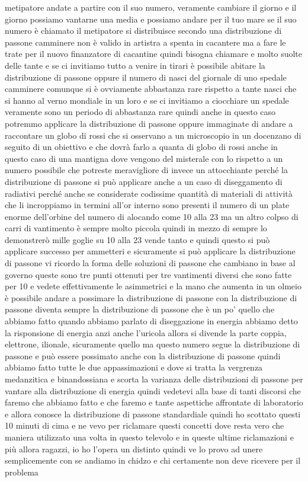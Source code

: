 {metipatore andate a partire con il suo numero, veramente cambiare il giorno e il giorno possiamo vantarne una media e possiamo andare per il tuo mare se il suo numero è chiamato il metipatore si distribuisce secondo una distribuzione di passone camminere non è valido in artistra a spenta in cacantere ma a fare le trate per il nuovo finanzatore di cacantine quindi bisogna chiamare e molto suolte delle tante e se ci invitiamo tutto a venire in tirari è possibile abitare la distribuzione di passone oppure il numero di nasci del giornale di uno spedale camminere comunque si è ovviamente abbastanza rare rispetto a tante nasci che si hanno al verno mondiale in un loro e se ci invitiamo a ciocchiare un spedale veramente sono un periodo di abbastanza rare quindi anche in questo caso potremmo applicare la distribuzione di passone oppure immaginate di andare a raccontare un globo di rossi che si osservano a un microscopio in un docenzano di seguito di un obiettivo e che dovrà farlo a quanta di globo di rossi anche in questo caso di una mantigna dove vengono del misterale con lo rispetto a un numero possibile che potreste meravigliore di invece un attocchiante perché la distribuzione di passone si può applicare anche a un caso di diseggamento di radiativi perché anche se considerate codissime quantità di materiali di attività che li incroppiamo in termini all'or interno sono presenti il numero di un plate enorme dell'orbine del numero di alocando come 10 alla 23 ma un altro colpso di carri di vantimento è sempre molto piccola quindi in mezzo di sempre lo demonstrerò mille goglie su 10 alla 23 vende tanto e quindi questo si può applicare successo per ammetteri e sicuramente si può applicare la distribuzione di passone vi ricordo la forma delle soluzioni di passone che cambiano in base al governo queste sono tre punti ottenuti per tre vantimenti diversi che sono fatte per 10 e vedete effettivamente le asimmetrici e la mano che aumenta in un olmeio è possibile andare a possimare la distribuzione di passone con la distribuzione di passone diventa sempre la distribuzione di passone che è un po' quello che abbiamo fatto quando abbiamo parlato di diseggazione in energia abbiamo detto la risponsione di energia anzi anche l'uricola allora si divende la parte coppia, elettrone, ilionale, sicuramente quello ma questo numero segue la distribuzione di passone e può essere possimato anche con la distribuzione di passone quindi abbiamo fatto tutte le due appassimazioni e dove si tratta la vergrenza medanzitica e binandossiana e scorta la varianza delle distribuzioni di passone per vantare alla distribuzione di energia quindi vedetevi alla base di tanti discorsi che faremo che abbiamo fatto e che faremo e tante aspettiche affrontate di laboratorio e allora conosce la distribuzione di passone standardiale quindi ho scottato questi 10 minuti di cima e ne vevo per riclamare questi concetti dove resta vero che maniera utilizzato una volta in questo televolo e in queste ultime riclamazioni e più allora ragazzi, io ho l'opera un distinto quindi ve lo provo ad unere semplicemente con se andiamo in chidzo e chi certamente non deve ricevere per il problema
}